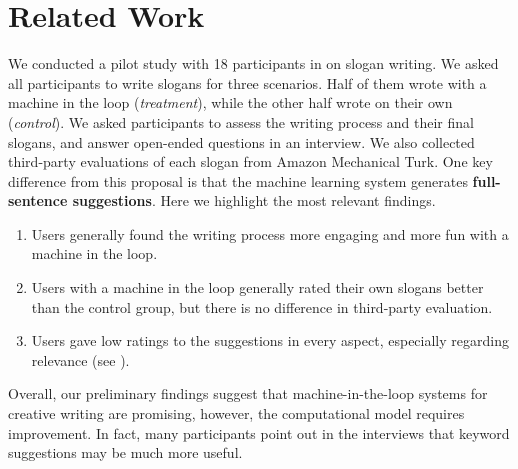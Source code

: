 
\section{Related Work}


 We conducted a pilot study with 18 participants in \citet{clark+etal18} on slogan writing.
We asked all participants to write slogans for three scenarios.
Half of them wrote with a machine in the loop ({\em treatment}), while the other half wrote on their own ({\em control}).
We asked participants to assess the writing process and their final slogans, and answer open-ended questions in an interview.
We also collected third-party evaluations of each slogan from Amazon Mechanical Turk.
One key difference from this proposal is that the machine learning system generates {\bf full-sentence suggestions}.
Here we highlight the most relevant findings.


\begin{enumerate}[leftmargin=*,noitemsep,topsep=0pt,parsep=0pt,partopsep=0pt]
    \item Users generally found the writing process more engaging and more fun with a machine in the loop.
    \item Users with a machine in the loop generally rated their own slogans better than the control group, but there is no difference in third-party evaluation.
    \item Users gave low ratings to the suggestions in every aspect, especially regarding relevance (see ).
\end{enumerate}

Overall, our preliminary findings suggest that machine-in-the-loop systems for creative writing are promising, however, the computational model requires improvement. 
In fact, many participants point out in the interviews that keyword suggestions may be much more useful.
